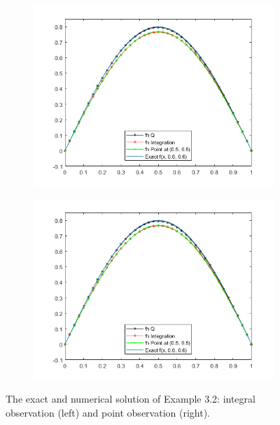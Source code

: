 \documentclass[]{article}
\begin{document}
\begin{figure}[h!]
	\begin{subfigure}{.5\linewidth}
		\centering
		\includegraphics[width=\linewidth]{../FreeFem++/fhx}
	\end{subfigure}%
	\begin{subfigure}{.5\linewidth}
		\centering
		\includegraphics[width=\linewidth]{../FreeFem++/fhx}
	\end{subfigure}
	\caption{The exact and numerical solution of Example 3.2: integral observation (left) and point observation (right).}
\end{figure}
\end{document}
